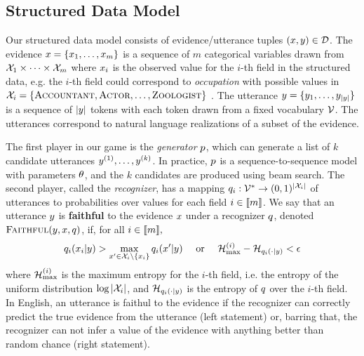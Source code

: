   \subsection{Structured Data Model}
  \label{sec:struct_data_model}

  Our structured data model consists of evidence/utterance tuples $(x, y)\in
  \mathcal{D}$.
   The evidence $x = \{x_1, \ldots, x_m\}$
   is a sequence of $m$ categorical variables drawn from  
   $\mathcal{X}_1 \times \cdots \times \mathcal{X}_{m}$ where $x_i$ is the observed value for the 
   $i$-th field in the structured data, e.g. the $i$-th field could correspond 
   to \textit{occupation} with possible values
   in $\mathcal{X}_i = 
   \{ \textsc{Accountant}, \textsc{Actor},
    \ldots, \textsc{Zoologist} \}$ .
The utterance $y = \{y_1,\ldots, 
y_{|y|}\}$ is a 
  sequence of $|y|$ tokens with each token drawn from a fixed 
  vocabulary $\mathcal{V}$. The utterances correspond to natural language 
  realizations of a subset
  of the evidence.

  The first player in our game is the \textit{generator} $p$, which can 
  generate a list of $k$ candidate utterances $y^{(1)},\ldots,
  y^{(k)}$. In practice, $p$ is a sequence-to-sequence 
  model \citep{bahdanau2014neural} with parameters $\theta$, and the $k$ 
candidates are produced using beam search.
 The second player, called the \textit{recognizer}, has a mapping
 $q_i : \mathcal{V}^* \rightarrow (0,1)^{|\mathcal{X}_i|}$ of utterances to
 probabilities over values for each field
 $i \in \llbracket m \rrbracket$. We say that an utterance $y$ is \textbf{faithful}
 to the evidence $x$ under a recognizer $q$, 
denoted $\textsc{Faithful}(y,x,q)$, if, for all $i\in \llbracket m \rrbracket,$
\[ q_i(x_i|y) >
 \max_{x^\prime \in \mathcal{X}_i \setminus \{x_i\}}
  q_i(x^\prime|y) 
  \quad \textrm{ or } \quad  
  \mathcal{H}^{(i)}_{\max} - \mathcal{H}_{q_i(\cdot|y)} < \epsilon\]
where $\mathcal{H}^{(i)}_{\max}$ is the maximum entropy for the $i$-th field,
i.e. the entropy of the uniform distribution 
$\log |\mathcal{X}_i|$, and $\mathcal{H}_{q_i(\cdot|y)}$ 
is the entropy of $q$ over the $i$-th field. In English, 
an utterance is faithul to the evidence if the recognizer can correctly
predict the true evidence from the utterance (left statement) or, barring that,
the recognizer can not infer a value of the evidence with
anything better than random chance (right statement).


